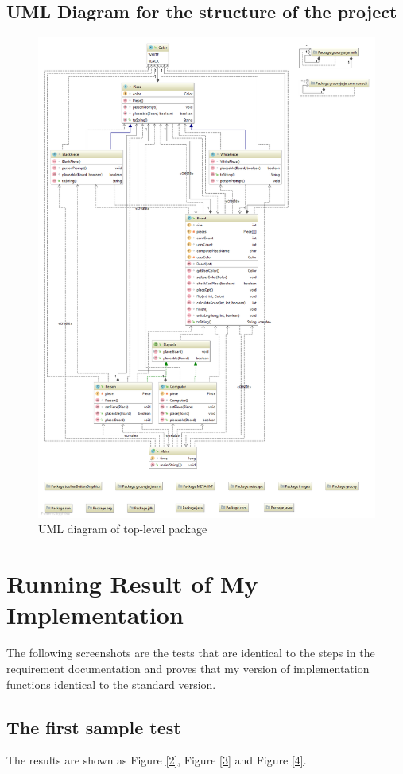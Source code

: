 \documentclass[a4paper]{report}
\begin{document}
\section{UML Diagram for the structure of the project}
\begin{figure}
  \centering
  \includegraphics[width=15cm]{Top-LevelPackage.png}
  \caption{UML diagram of top-level package}\label{1}
\end{figure}

\chapter{Running Result of My Implementation}
The following screenshots are the tests that are identical to the steps in the requirement documentation and proves that my version of implementation functions identical to the standard version.
\section{The first sample test}
The results are shown as Figure \ref{2}, Figure \ref{3} and Figure \ref{4}. 
\end{document}
